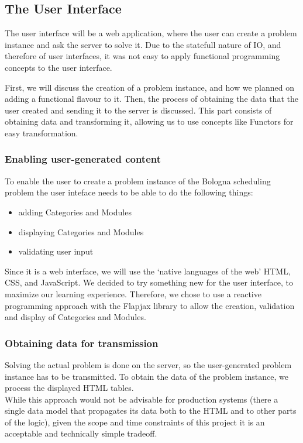 \documentclass[a4paper]{article}
\begin{document}
\subsection{The User Interface}
\label{sec:design-ui}
The user interface will be a web application, 
where the user can create a problem instance and ask the server to solve it.
Due to the statefull nature of IO, and therefore of user interfaces,
it was not easy to apply functional programming concepts to the user interface.

First, we will discuss the creation of a problem instance, 
and how we planned on adding a functional flavour to it.
Then, the process of obtaining the data that the user created and sending
it to the server is discussed.
This part consists of obtaining data and transforming it, 
allowing us to use concepts like Functors for easy transformation.

\subsubsection{Enabling user-generated content}
To enable the user to create a problem instance of the Bologna scheduling problem
the user inteface needs to be able to do the following things:
\begin{itemize}
	\item adding Categories and Modules
	\item displaying Categories and Modules
	\item validating user input
\end{itemize}
Since it is a web interface, we will use the `native languages of the web' HTML, CSS,
and JavaScript.
We decided to try something new for the user interface, 
to maximize our learning experience.
Therefore, we chose to use a reactive programming approach with the Flapjax library \cite{flapjax} to allow the creation, validation and display of Categories and Modules.

\subsubsection{Obtaining data for transmission}
\label{sec:ObtainingData}
Solving the actual problem is done on the server, so the
user-generated problem instance has to be transmitted. To obtain the
data of the problem instance, we process the displayed HTML tables.\\

While this approach would not be advisable for production systems
(there a single data model that propagates its data both to the HTML
and to other parts of the logic), given the scope and time constraints
of this project it is an acceptable and technically simple tradeoff.\\
\end{document}
